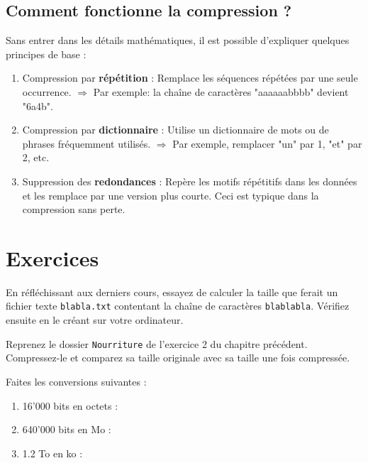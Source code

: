 \documentclass[11pt, a4paper]{book}
\begin{document}
\subsection{Comment fonctionne la compression ?}
 Sans entrer dans les détails mathématiques, il est possible d’expliquer quelques principes de base :
\begin{enumerate}
    \item Compression par \textbf{répétition} :
 Remplace les séquences répétées par une seule occurrence.
$\Rightarrow$ Par exemple: la chaîne de caractères "aaaaaabbbb" devient "6a4b".
    \item Compression par \textbf{dictionnaire} :
 Utilise un dictionnaire de mots ou de phrases fréquemment utilisés.
$\Rightarrow$ Par exemple, remplacer "un" par 1, "et" par 2, etc.
    \item Suppression des \textbf{redondances} :
 Repère les motifs répétitifs dans les données et les remplace par une version plus courte. Ceci est typique dans la compression sans perte.
\end{enumerate}


\section{Exercices}

\begin{exercice}
En réfléchissant aux derniers cours, essayez de calculer la taille que ferait un fichier texte \texttt{blabla.txt} contentant la chaîne de caractères \texttt{blablabla}.
Vérifiez ensuite en le créant sur votre ordinateur.
\end{exercice}


\begin{exercice}
Reprenez le dossier \texttt{Nourriture} de l'exercice 2 du chapitre précédent. Compressez-le et comparez sa taille originale avec sa taille une fois compressée.
\end{exercice}


\begin{exercice}
    Faites les conversions suivantes : 
    \begin{enumerate}
        \item 16'000 bits en octets :
        \item 640'000 bits en Mo :
        \item 1.2 To en ko : 
    \end{enumerate}
\end{exercice}
\end{document}
